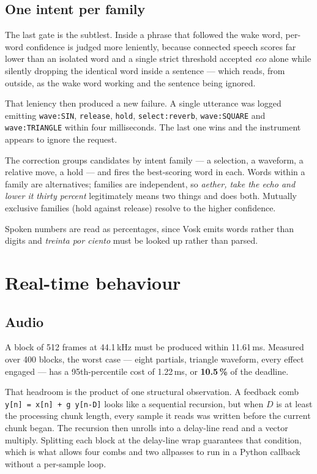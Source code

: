 \documentclass[a4paper,10pt,twocolumn]{article}
\newcommand{\code}[1]{\texttt{\small #1}}
\begin{document}
\subsection{One intent per family}

The last gate is the subtlest. Inside a phrase that followed the wake word,
per-word confidence is judged more leniently, because connected speech scores
far lower than an isolated word and a single strict threshold accepted
\emph{eco} alone while silently dropping the identical word inside a sentence
--- which reads, from outside, as the wake word working and the sentence being
ignored.

That leniency then produced a new failure. A single utterance was logged
emitting \code{wave:SIN}, \code{release}, \code{hold}, \code{select:reverb},
\code{wave:SQUARE} and \code{wave:TRIANGLE} within four milliseconds. The last
one wins and the instrument appears to ignore the request.

The correction groups candidates by intent family --- a selection, a waveform,
a relative move, a hold --- and fires the best-scoring word in each. Words
within a family are alternatives; families are independent, so
\emph{aether, take the echo and lower it thirty percent} legitimately means two
things and does both. Mutually exclusive families (hold against release) resolve
to the higher confidence.

Spoken numbers are read as percentages, since Vosk emits words rather than
digits and \emph{treinta por ciento} must be looked up rather than parsed.

\section{Real-time behaviour}

\subsection{Audio}

A block of 512 frames at 44.1\,kHz must be produced within 11.61\,ms. Measured
over 400 blocks, the worst case --- eight partials, triangle waveform, every
effect engaged --- has a 95th-percentile cost of 1.22\,ms, or \textbf{10.5\,\%}
of the deadline.

That headroom is the product of one structural observation. A feedback comb
\code{y[n] = x[n] + g\,y[n-D]} looks like a sequential recursion, but when $D$
is at least the processing chunk length, every sample it reads was written
before the current chunk began. The recursion then unrolls into a delay-line
read and a vector multiply. Splitting each block at the delay-line wrap
guarantees that condition, which is what allows four combs and two allpasses to
run in a Python callback without a per-sample loop.
\end{document}
